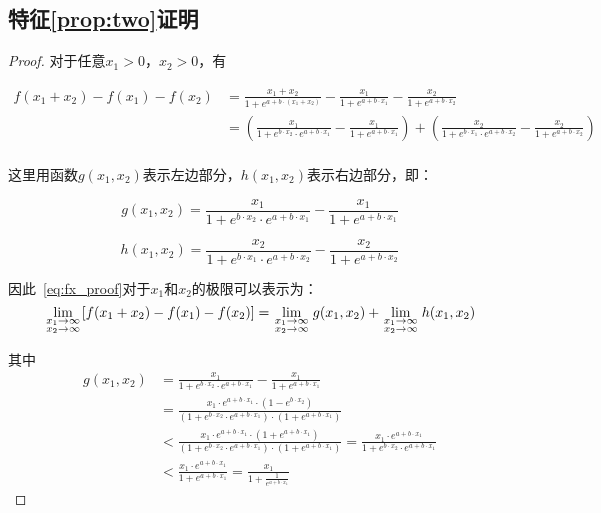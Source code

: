 \subsection{特征\ref{prop:two}证明}
\begin{proof}
对于任意$x_1>0$，$x_2>0$，有

\begin{equation}
\label{eq:fx_proof}
\begin{aligned}
f(x_1+x_2)-f(x_1)-f(x_2)&=\frac{x_1+x_2}{1+e^{a+b\cdot (x_1+x_2)}}-\frac{x_1}{1+e^{a+b\cdot x_1}}-\frac{x_2}{1+e^{a+b\cdot x_2}}\\
&=(\frac{x_1}{1+e^{b\cdot x_2}\cdot e^{a+b\cdot {x_1}}}-\frac{x_1}{1+e^{a+b\cdot x_1}})+(\frac{x_2}{1+e^{b\cdot x_1}\cdot e^{a+b\cdot {x_2}}}-\frac{x_2}{1+e^{a+b\cdot x_2}})\\
\end{aligned}
\end{equation}

这里用函数$g(x_1,x_2)$表示左边部分，$h(x_1,x_2)$表示右边部分，即：

\begin{equation}
\label{eq:gx_func_proof}
g(x_1,x_2)=\frac{x_1}{1+e^{b\cdot x_2}\cdot e^{a+b\cdot {x_1}}}-\frac{x_1}{1+e^{a+b\cdot x_1}}
\end{equation}

\begin{equation}
\label{eq:hx_func_proof}
h(x_1,x_2)=\frac{x_2}{1+e^{b\cdot x_1}\cdot e^{a+b\cdot {x_2}}}-\frac{x_2}{1+e^{a+b\cdot x_2}}
\end{equation}

因此~\eqref{eq:fx_proof}对于$x_1$和$x_2$的极限可以表示为：
\[
\mathop {\lim }\limits_{\scriptstyle x_1 \to \infty  \hfill \atop  \scriptstyle x_2 \to \infty  \hfill}[f(x_1+x_2)-f(x_1)-f(x_2)]=\mathop {\lim }\limits_{\scriptstyle x_1 \to \infty  \hfill \atop  \scriptstyle x_2 \to \infty  \hfill}g(x_1,x_2)+\mathop {\lim }\limits_{\scriptstyle x_1 \to \infty  \hfill \atop  \scriptstyle x_2 \to \infty  \hfill}h(x_1,x_2)
\]

其中
\[
\begin{aligned}
g(x_1,x_2)&=\frac{x_1}{1+e^{b\cdot x_2}\cdot e^{a+b\cdot {x_1}}}-\frac{x_1}{1+e^{a+b\cdot x_1}}\\
&=\frac{x_1\cdot e^{a+b\cdot x_1}\cdot(1-e^{b\cdot x_2})}{(1+e^{b\cdot x_2}\cdot e^{a+b\cdot x_1})\cdot(1+e^{a+b\cdot x_1})}\\
&<\frac{x_1\cdot e^{a+b\cdot x_1}\cdot(1+e^{a+b\cdot x_1})}{(1+e^{b\cdot x_2}\cdot e^{a+b\cdot x_1})\cdot(1+e^{a+b\cdot x_1})}=\frac{x_1\cdot e^{a+b\cdot x_1}}{1+e^{b\cdot x_2}\cdot e^{a+b\cdot x_1}}\\
&<\frac{x_1\cdot e^{a+b\cdot x_1}}{1+e^{a+b\cdot x_1}}=\frac{x_1}{1+\frac{1}{e^{a+b\cdot x_1}}}
\end{aligned}
\]


\end{proof}
